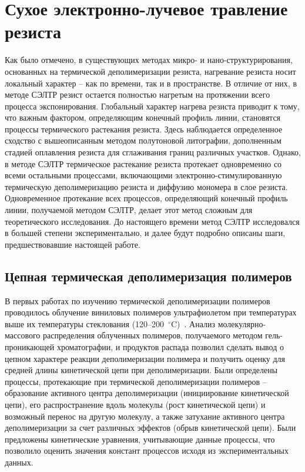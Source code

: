 \section{Сухое электронно-лучевое травление резиста}

Как было отмечено, в существующих методах микро- и нано-структурирования, основанных на термической деполимеризации резиста, нагревание резиста носит локальный характер -- как по времени, так и в пространстве. В отличие от них, в методе СЭЛТР резист остается полностью нагретым на протяжении всего процесса экспонирования. Глобальный характер нагрева резиста приводит к тому, что важным фактором, определяющим конечный профиль линии, становятся процессы термического растекания резиста. Здесь наблюдается определенное сходство с вышеописанным методом полутоновой литографии, дополненным стадией оплавления резиста для сглаживания границ различных участков. Однако, в методе СЭЛТР термическое растекание резиста протекает одновременно со всеми остальными процессами, включающими электронно-стимулированную термическую деполимеризацию резиста и диффузию мономера в слое резиста. Одновременное протекание всех процессов, определяющий конечный профиль линии, получаемой методом СЭЛТР, делает этот метод сложным для теоретического исследования. До настоящего времени метод СЭЛТР исследовался в большей степени экспериментально, и далее будут подробно описаны шаги, предшествовавшие настоящей работе.


\subsection{Цепная термическая деполимеризация полимеров}
В первых работах по изучению термической деполимеризации полимеров проводилось облучение виниловых полимеров ультрафиолетом при температурах выше их температуры стеклования (120--200~$^\circ$C)~\cite{Cowley_1952_1, Cowley_1952_2, Grassie1949_1, Grassie1949_2, Grassie1949_3, Grassie1949_4}. Анализ молекулярно-массового распределения облученных полимеров, получаемого методом гель-проникающей хроматографии, и продуктов распада позволил сделать вывод о цепном характере реакции деполимеризации полимера и получить оценку для средней длины кинетической цепи при деполимеризации. Были определены процессы, протекающие при термической деполимеризации полимеров -- образование активного центра деполимеризации (инициирование кинетической цепи), его распространение вдоль молекулы (рост кинетической цепи) и возможный перенос на другую молекулу, а также затухание активного центра деполимеризации за счет различных эффектов (обрыв кинетической цепи). Были предложены кинетические уравнения, учитывающие данные процессы, что позволило оценить значения констант процессов исходя из экспериментальных данных.


